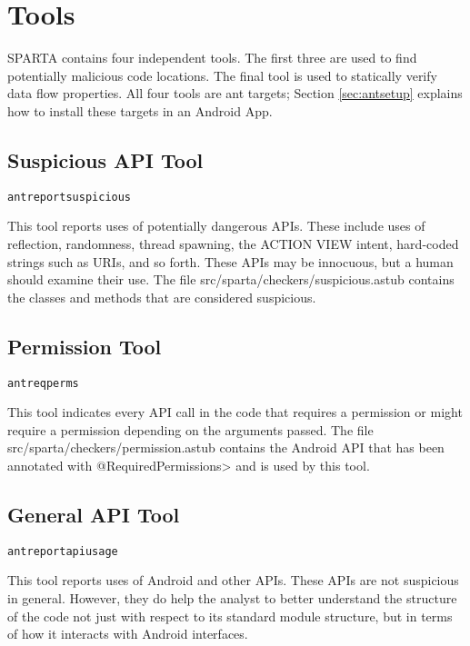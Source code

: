 \htmlhr
\chapter{Tools\label{tools}}

SPARTA contains four independent tools.  The first three are used to find potentially malicious code locations.  The final tool is used to statically verify data flow properties.  All four tools are ant targets;  Section
\ref{sec:antsetup} explains how to install these targets in an Android App.

\section{Suspicious API Tool\label{sec:suspicioustool}}

\begin{alltt}
ant reportsuspicious
\end{alltt}


This tool reports uses of potentially dangerous APIs. These include uses of reflection, randomness, thread spawning, the ACTION VIEW intent, hard-coded strings such as URIs, and so forth. These APIs may be innocuous, but a human should examine their use.  The file src/sparta/checkers/suspicious.astub contains the classes and methods that are considered suspicious. 

\section{Permission Tool\label{sec:permtool}}
 
 \begin{alltt}
ant reqperms
\end{alltt}
 
This tool indicates every API call in the code that requires a permission or might require a permission 
depending on the arguments passed.  The file src/sparta/checkers/permission.astub contains the Android API that has been annotated with \<@RequiredPermissions> and is used by this tool.

\section{General API Tool\label{sec:generaltool}}

\begin{alltt}
ant reportapiusage
\end{alltt}

This tool reports uses of Android and other APIs. These APIs are not suspicious in general. However, they do help the analyst to better understand the structure of the code not just with respect to its standard module structure, but in terms of how it interacts with Android interfaces. 

